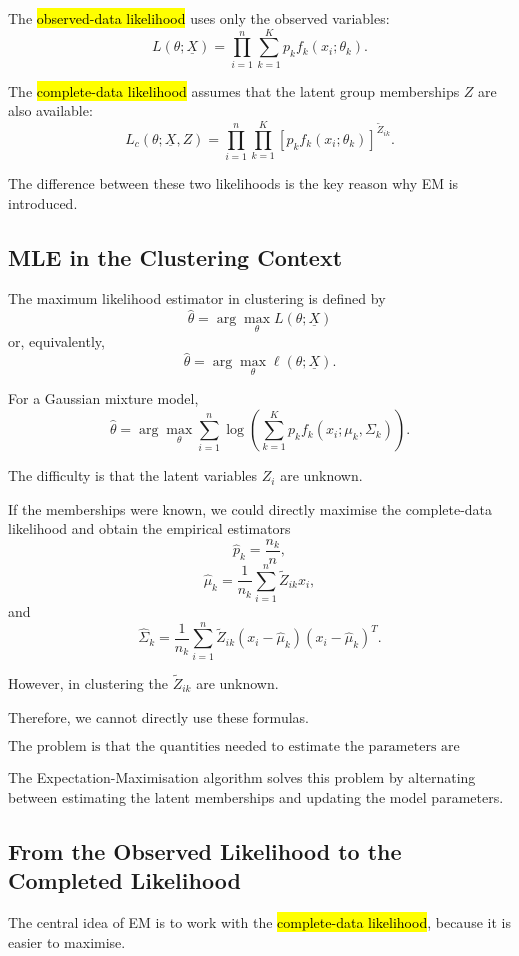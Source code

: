 The \hl{observed-data likelihood} uses only the observed variables:
\[
\boxed{
L(\theta;\underline{X})
=
\prod_{i=1}^n
\sum_{k=1}^K
p_kf_k(x_i;\theta_k)
}.
\]

The \hl{complete-data likelihood} assumes that the latent group
memberships $Z$ are also available:
\[
\boxed{
L_c(\theta;\underline{X},Z)
=
\prod_{i=1}^n
\prod_{k=1}^K
\left[
p_kf_k(x_i;\theta_k)
\right]^{\tilde Z_{ik}}
}.
\]

The difference between these two likelihoods is the key reason why
EM is introduced.

\subsection{MLE in the Clustering Context}

The maximum likelihood estimator in clustering is defined by
\[
\boxed{
\hat\theta
=
\arg\max_{\theta}
L(\theta;\underline{X})
}
\]
or, equivalently,
\[
\boxed{
\hat\theta
=
\arg\max_{\theta}
\ell(\theta;\underline{X})
}.
\]

For a Gaussian mixture model,
\[
\hat\theta
=
\arg\max_{\theta}
\sum_{i=1}^n
\log
\left(
\sum_{k=1}^K
p_kf_k(x_i;\mu_k,\Sigma_k)
\right).
\]

The difficulty is that the latent variables $Z_i$ are unknown.

If the memberships were known, we could directly maximise the
complete-data likelihood and obtain the empirical estimators
\[
\hat p_k=\frac{n_k}{n},
\]
\[
\hat\mu_k
=
\frac{1}{n_k}
\sum_{i=1}^n
\tilde Z_{ik}x_i,
\]
and
\[
\hat\Sigma_k
=
\frac{1}{n_k}
\sum_{i=1}^n
\tilde Z_{ik}
(x_i-\hat\mu_k)
(x_i-\hat\mu_k)^T.
\]

However, in clustering the $\tilde Z_{ik}$ are unknown.

Therefore, we cannot directly use these formulas.

\[
\boxed{
\text{The problem is that the quantities needed to estimate the
parameters are themselves unknown.}
}
\]

The Expectation-Maximisation algorithm solves this problem by
alternating between estimating the latent memberships and updating
the model parameters.

\subsection{From the Observed Likelihood to the Completed Likelihood}

The central idea of EM is to work with the
\hl{complete-data likelihood}, because it is easier to maximise.

